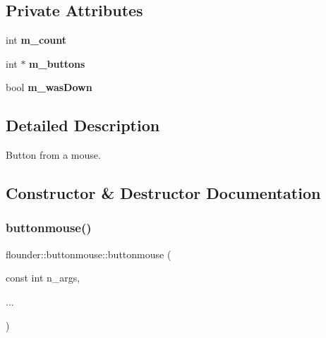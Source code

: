 \subsection*{Private Attributes}
\begin{DoxyCompactItemize}
\item 
\mbox{\label{classflounder_1_1buttonmouse_abedc20e1fc3ccc65a4e0c64ebe801935}} 
int {\bfseries m\+\_\+count}
\item 
\mbox{\label{classflounder_1_1buttonmouse_a8e520120c157797cfe59c267eac13689}} 
int $\ast$ {\bfseries m\+\_\+buttons}
\item 
\mbox{\label{classflounder_1_1buttonmouse_aa65460a6d76ece35fd264bc7a5185b47}} 
bool {\bfseries m\+\_\+was\+Down}
\end{DoxyCompactItemize}


\subsection{Detailed Description}
Button from a mouse. 



\subsection{Constructor \& Destructor Documentation}
\mbox{\label{classflounder_1_1buttonmouse_a6721eb42c25bc50c2a4db56ca27c4cda}} 
\subsubsection{\texorpdfstring{buttonmouse()}{buttonmouse()}}
{\footnotesize\ttfamily flounder\+::buttonmouse\+::buttonmouse (\begin{DoxyParamCaption}\item[{const int}]{n\+\_\+args,  }\item[{}]{... }\end{DoxyParamCaption})\hspace{0.3cm}{\ttfamily [inline]}}



